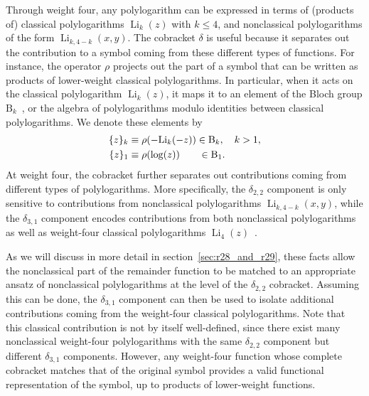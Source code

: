 \documentclass[11pt]{article}
\DeclareMathOperator{\Li}{Li}
\begin{document}
Through weight four, any polylogarithm can be expressed in terms of (products of) classical polylogarithms $\Li_k(z)$ with $k \leq 4$, and nonclassical polylogarithms of the form $\Li_{k,4-k}(x,y)$. The cobracket $\delta$ is useful because it separates out the contribution to a symbol coming from these different types of functions. For instance, the operator $\rho$ projects out the part of a symbol that can be written as products of lower-weight classical polylogarithms. In particular, when it acts on the classical polylogarithm $\Li_k(z)$, it maps it to an element of the Bloch group $\text{B}_k$~\cite{Bloch:2000, Suslin:1990}, or the algebra of polylogarithms modulo identities between classical polylogarithms. We denote these elements by
\begin{align}
 \{ z \}_k  &\equiv \rho(-\text{Li}_k(-z)) \in \text{B}_k, \quad k>1, \\
 \{ z \}_1  &\equiv \rho(\log(z)) \hspace{.675cm} \in \text{B}_1.
\end{align}
At weight four, the cobracket further separates out contributions coming from different types of polylogarithms. More specifically, the $\delta_{2,2}$ component is only sensitive to contributions from nonclassical polylogarithms $\Li_{k,4-k}(x,y)$, while the $\delta_{3,1}$ component encodes contributions from both nonclassical polylogarithms as well as weight-four classical polylogarithms $\Li_4(z)$~\cite{G91a,2008arXiv0809.3984D,GanglPolylogIdentities,2018arXiv180107816G,2018arXiv180308585G}. 

As we will discuss in more detail in section~\ref{sec:r28_and_r29}, these facts allow the nonclassical part of the remainder function to be matched to an appropriate ansatz of nonclassical polylogarithms at the level of the $\delta_{2,2}$ cobracket. Assuming this can be done, the $\delta_{3,1}$ component can then be used to isolate additional contributions coming from the weight-four classical polylogarithms. Note that this classical contribution is not by itself well-defined, since there exist many nonclassical weight-four polylogarithms with the same $\delta_{2,2}$ component but different $\delta_{3,1}$ components. However, any weight-four function whose complete cobracket matches that of the original symbol provides a valid functional representation of the symbol, up to products of lower-weight functions.  
\end{document}
